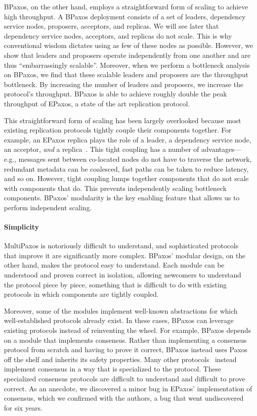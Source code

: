 BPaxos, on the other hand, employs a straightforward form of scaling to achieve
high throughput. A BPaxos deployment consists of a set of leaders, dependency
service nodes, proposers, acceptors, and replicas. We will see later that
dependency service nodes, acceptors, and replicas do not scale. This is why
conventional wisdom dictates using as few of these nodes as possible.  However,
we show that leaders and proposers operate independently from one another and
are thus ``embarrassingly scalable''. Moreover, when we perform a bottleneck
analysis on BPaxos, we find that these scalable leaders and proposers are the
throughput bottleneck. By increasing the number of leaders and proposers, we
increase the protocol's throughput. BPaxos is able to achieve roughly double
the peak throughput of EPaxos, a state of the art replication protocol.

This straightforward form of scaling has been largely overlooked because most
existing replication protocols tightly couple their components together. For
example, an EPaxos replica plays the role of a leader, a dependency service
node, an acceptor, \emph{and} a replica~\cite{arun2017speeding}. This tight
coupling has a number of advantages---e.g., messages sent between co-located
nodes do not have to traverse the network, redundant metadata can be coalesced,
fast paths can be taken to reduce latency, and so on. However, tight coupling
lumps together components that do not scale with components that do. This
prevents independently scaling bottleneck components. BPaxos' modularity is the
key enabling feature that allows us to perform independent scaling.

\paragraph{Simplicity}
MultiPaxos is notoriously difficult to understand, and sophisticated protocols
that improve it are significantly more complex. BPaxos' modular design, on the
other hand, makes the protocol easy to understand. Each module can be
understood and proven correct in isolation, allowing newcomers to understand
the protocol piece by piece, something that is difficult to do with existing
protocols in which components are tightly coupled.

Moreover, some of the modules implement well-known abstractions for which
well-established protocols already exist. In these cases, BPaxos can leverage
existing protocols instead of reinventing the wheel. For example, BPaxos
depends on a module that implements consensus. Rather than implementing a
consensus protocol from scratch and having to prove it correct, BPaxos instead
uses Paxos off the shelf and inherits its safety properties. Many other
protocols~\cite{moraru2013there, arun2017speeding, nawab2018dpaxos} instead
implement consensus in a way that is specialized to the protocol. These
specialized consensus protocols are difficult to understand and difficult to
prove correct. As an anecdote, we discovered a minor bug in EPaxos'
implementation of consensus, which we confirmed with the authors, a bug that
went undiscovered for six years.

